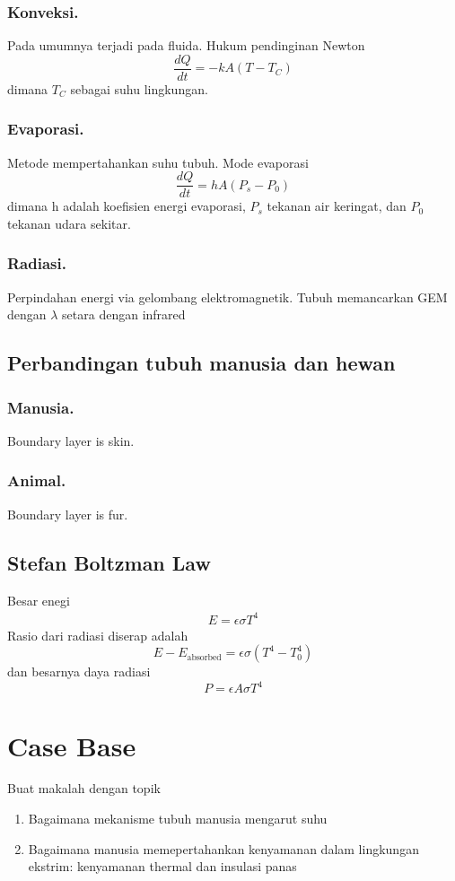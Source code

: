 \documentclass[../main.tex]{subfiles}
\begin{document}
\subsubsection*{Konveksi.}
Pada umumnya terjadi pada fluida. Hukum pendinginan Newton 
\begin{equation*}
    \frac{dQ}{dt}=-kA(T-T_C)
\end{equation*}
dimana $T_C$ sebagai suhu lingkungan.
\subsubsection*{Evaporasi.} Metode mempertahankan suhu tubuh. Mode evaporasi 
\begin{equation*}
    \frac{dQ}{dt}=hA(P_s-P_0)
\end{equation*}
dimana h adalah koefisien energi evaporasi, $P_s$ tekanan air keringat, dan $P_0$ tekanan udara sekitar.

\subsubsection*{Radiasi.} Perpindahan energi via gelombang elektromagnetik. Tubuh memancarkan GEM dengan $\lambda$ setara dengan infrared

\subsection*{Perbandingan tubuh manusia dan hewan}
\subsubsection*{Manusia.} Boundary layer is skin.
\subsubsection*{Animal.} Boundary layer is fur.

\subsection*{Stefan Boltzman Law}
Besar enegi
\begin{eqnarray}
    E=\epsilon\sigma T^4
\end{eqnarray}
Rasio dari radiasi diserap adalah
\begin{equation*}
    E-E_{\text{absorbed}}=\epsilon \sigma (T^4-T_0^4)
\end{equation*}
dan besarnya daya radiasi 
\begin{equation*}
    P=\epsilon A \sigma T^4
\end{equation*}

\section*{Case Base} Buat makalah dengan topik
\begin{enumerate}
\item Bagaimana mekanisme tubuh manusia mengarut suhu
\item Bagaimana manusia memepertahankan kenyamanan dalam lingkungan ekstrim: kenyamanan thermal dan insulasi panas
\end{enumerate}
\end{document}
